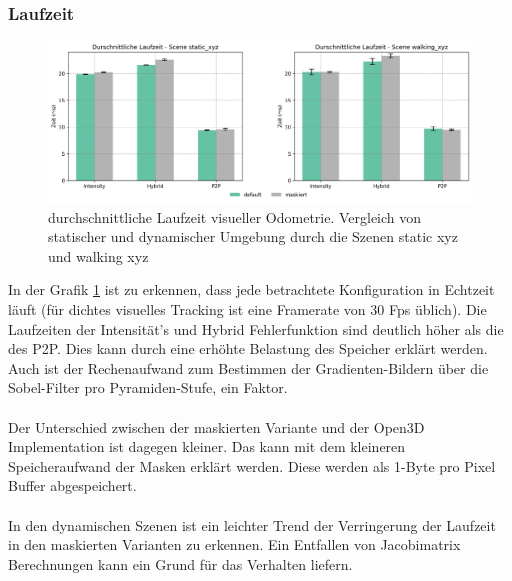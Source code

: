 \documentclass[12pt,DIV=15,BCOR=15mm,twoside,headsepline,abstract=true,listof=totoc,bibliography=totoc]{scrreprt}
\theoremstyle{remark}    %
\begin{document}
    \subsubsection{Laufzeit}
    \begin{figure}[h]
        \centering
        \includegraphics[width=\textwidth]{pics/odom_time_avg.png}
        \caption{durchschnittliche Laufzeit visueller Odometrie. Vergleich von statischer und dynamischer Umgebung durch die Szenen \glqq static xyz \grqq
        und \glqq walking xyz \grqq}
        \label{fig:avg_Laufzeit}
    \end{figure} \noindent
    In der Grafik \ref{fig:avg_Laufzeit} ist zu erkennen, dass jede betrachtete Konfiguration in Echtzeit läuft (für dichtes visuelles Tracking ist eine 
    Framerate von 30 Fps üblich).
    Die Laufzeiten der Intensität's und Hybrid Fehlerfunktion sind deutlich höher als die des \ac{P2P}. Dies kann durch eine erhöhte Belastung des Speicher 
    erklärt werden. Auch ist der Rechenaufwand zum Bestimmen der Gradienten-Bildern über die Sobel-Filter pro Pyramiden-Stufe, ein Faktor.\\\\
    Der Unterschied zwischen der maskierten Variante und der Open3D Implementation ist dagegen kleiner. Das kann mit dem kleineren Speicheraufwand der Masken 
    erklärt werden. Diese werden als 1-Byte pro Pixel Buffer abgespeichert.\\\\
    In den dynamischen Szenen ist ein leichter Trend der Verringerung der 
    Laufzeit in den maskierten Varianten zu erkennen. Ein Entfallen von Jacobimatrix Berechnungen kann ein Grund für das Verhalten liefern.
\end{document}
